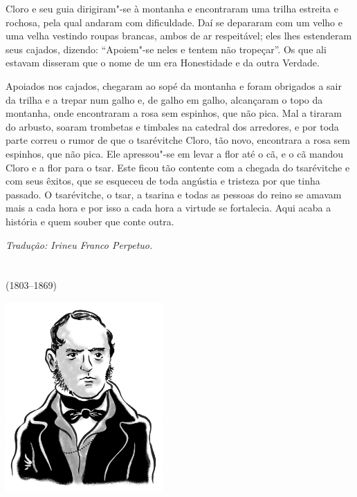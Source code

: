 Cloro e seu guia dirigiram"-se à montanha e encontraram uma trilha
estreita e rochosa, pela qual andaram com dificuldade. Daí se depararam
com um velho e uma velha vestindo roupas brancas, ambos de ar
respeitável; eles lhes estenderam seus cajados, dizendo: ``Apoiem"-se
neles e tentem não tropeçar''. Os que ali estavam disseram que o nome de
um era Honestidade e da outra Verdade.

Apoiados nos cajados, chegaram ao sopé da montanha e foram obrigados a
sair da trilha e a trepar num galho e, de galho em galho, alcançaram o
topo da montanha, onde encontraram a rosa sem espinhos, que não pica.
Mal a tiraram do arbusto, soaram trombetas e timbales na catedral dos
arredores, e por toda parte correu o rumor de que o tsarévitche Cloro,
tão novo, encontrara a rosa sem espinhos, que não pica. Ele apressou"-se
em levar a flor até o cã, e o cã mandou Cloro e a flor para o tsar. Este
ficou tão contente com a chegada do tsarévitche e com seus êxitos, que
se esqueceu de toda angústia e tristeza por que tinha passado. O
tsarévitche, o tsar, a tsarina e todas as pessoas do reino se amavam
mais a cada hora e por isso a cada hora a virtude se fortalecia. Aqui
acaba a história e quem souber que conte outra.\enlargethispage{\baselineskip}


{\footnotesize\hfill\emph{Tradução: Irineu Franco Perpetuo.}}

\chapter*{}
\label{part2}
\thispagestyle{empty}

\begin{vplace}[1.5]
{\HUGES\hfill{}}

{\LARGE\hfill\textlt(1803–1869)}
\end{vplace}

\pagebreak
\thispagestyle{empty}
\mbox{}
\vfill
\begin{center}
\includegraphics[width=6cm]{./imgs/autor2.jpg}
\end{center}


